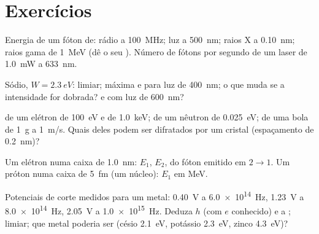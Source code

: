 \section{Exercícios}

\begin{exercise}[$\star$]\label{exo:b1:quantum-introduction:1}
Energia de um fóton de: rádio a \qty{100}{MHz}; luz a \qty{500}{nm};
raios X a \qty{0.10}{nm}; raios gama de \qty{1}{MeV} (dê o seu
). Número de fótons por segundo de um laser de \qty{1.0}{mW} a
\qty{633}{nm}.
\end{exercise}

\begin{exercise}[$\star$]\label{exo:b1:quantum-introduction:2}
Sódio, $W = \qty{2.3}{eV}$:  limiar;  máxima
e  para luz de \qty{400}{nm}; o que muda se a
intensidade for dobrada? e com luz de \qty{600}{nm}?
\end{exercise}

\begin{exercise}[$\star$]\label{exo:b1:quantum-introduction:3}
 de um elétron de \qty{100}{eV} e de \qty{1.0}{keV};
de um nêutron de \qty{0.025}{eV}; de uma bola de \qty{1}{g} a \qty{1}{m/s}.
Quais deles podem ser difratados por um cristal (espaçamento de \qty{0.2}{nm})?
\end{exercise}

\begin{exercise}[$\star$]\label{exo:b1:quantum-introduction:4}
Um elétron numa caixa de \qty{1.0}{nm}: $E_1$, $E_2$,  do
fóton emitido em $2 \to 1$. Um próton numa caixa de \qty{5}{fm}
(um núcleo): $E_1$ em \unit{MeV}.
\end{exercise}

\begin{exercise}[$\star\star$]\label{exo:b1:quantum-introduction:5}
Potenciais de corte medidos para um metal: \qty{0.40}{V} a
\qty{6.0e14}{Hz}, \qty{1.23}{V} a \qty{8.0e14}{Hz}, \qty{2.05}{V} a
\qty{1.0e15}{Hz}. Deduza $h$ (com $e$ conhecido) e a ;
 limiar; que metal poderia ser (césio \qty{2.1}{eV},
potássio \qty{2.3}{eV}, zinco \qty{4.3}{eV})?
\end{exercise}

